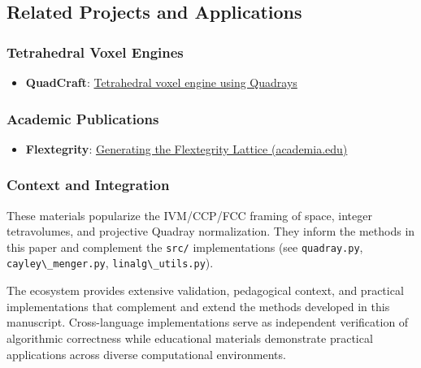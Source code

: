 \documentclass[
  10pt,
]{article}
\newcommand{\passthrough}[1]{#1}
\providecommand{\tightlist}{%
  \setlength{\itemsep}{0pt}\setlength{\parskip}{0pt}}
\begin{document}
\subsection{Related Projects and
Applications}\label{related-projects-and-applications}

\subsubsection{Tetrahedral Voxel
Engines}\label{tetrahedral-voxel-engines}

\begin{itemize}
\tightlist
\item
  \textbf{QuadCraft}:
  \href{https://github.com/docxology/quadcraft/}{Tetrahedral voxel
  engine using Quadrays}
\end{itemize}

\subsubsection{Academic Publications}\label{academic-publications}

\begin{itemize}
\tightlist
\item
  \textbf{Flextegrity}:
  \href{https://www.academia.edu/44531954/Generating_the_Flextegrity_Lattice}{Generating
  the Flextegrity Lattice (academia.edu)}
\end{itemize}

\subsubsection{Context and Integration}\label{context-and-integration}

These materials popularize the IVM/CCP/FCC framing of space, integer
tetravolumes, and projective Quadray normalization. They inform the
methods in this paper and complement the \passthrough{\lstinline!src/!}
implementations (see \passthrough{\lstinline!quadray.py!},
\passthrough{\lstinline!cayley\_menger.py!},
\passthrough{\lstinline!linalg\_utils.py!}).

The ecosystem provides extensive validation, pedagogical context, and
practical implementations that complement and extend the methods
developed in this manuscript. Cross-language implementations serve as
independent verification of algorithmic correctness while educational
materials demonstrate practical applications across diverse
computational environments.

\newpage
\end{document}
